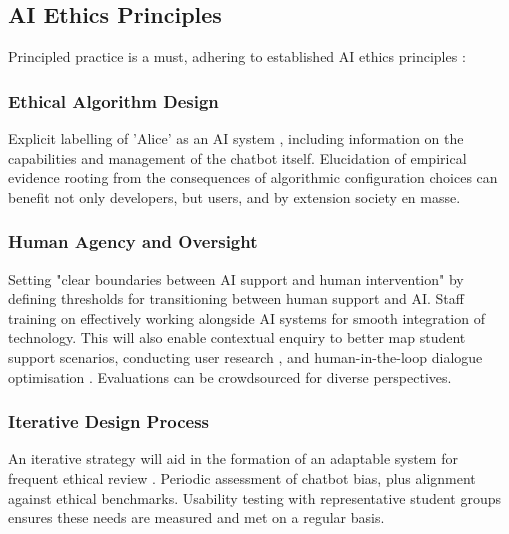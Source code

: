 \documentclass[14pt,a4paper]{article}
\begin{document}
\begin{multicols}{2}
\subsection{AI Ethics Principles}
Principled practice is a must, adhering to established AI ethics principles \textit{\parencite{EC2024}}:


\subsubsection{Ethical Algorithm Design}
Explicit labelling of 'Alice' as an AI system \textit{\parencite{IEEE2023}}, including information on the capabilities and management of the chatbot itself. Elucidation of empirical evidence rooting from the consequences of algorithmic configuration choices can benefit not only developers, but users, and by extension society en masse.

\subsubsection{Human Agency and Oversight}

Setting "clear boundaries between AI support and human intervention" \textit{\parencite{APA2024}}by defining thresholds for transitioning between human support and AI. Staff training on effectively working alongside AI systems for smooth integration of technology. This will also enable contextual enquiry to better map student support scenarios, conducting user research \textit{\parencite[pp. 50-100]{Goodman2023}}, and human-in-the-loop dialogue optimisation \textit{\parencite[pp. 30-60]{Vaughan2024}}. Evaluations can be crowdsourced for diverse perspectives.

\subsubsection{Iterative Design Process}
An iterative strategy \textit{\parencite[pp. 30-60]{HoltzblattBeyer2024}} will aid in the formation of an adaptable system for frequent ethical review \textit{\parencite{FloridiCowls2023}}. Periodic assessment of chatbot bias, plus alignment against ethical benchmarks. Usability testing with representative student groups ensures these needs are measured and met on a regular basis.


\end{multicols}
\end{document}
